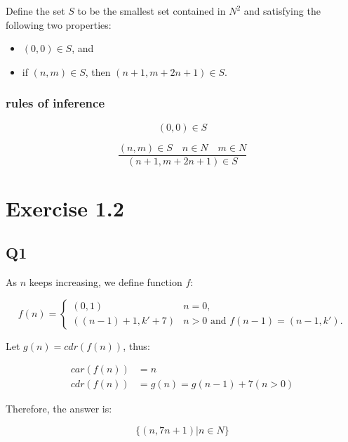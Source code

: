 \documentclass[11pt,a4paper]{article}
\begin{document}
Define the set $S$ to be the smallest set contained in $N^2$
and satisfying the following two properties:

\begin{itemize}
    \item{$(0,0) \in S$, and}
    \item{if $(n,m) \in S$, then $(n+1,m+2n+1) \in S$.}
\end{itemize}

\subsubsection{rules of inference}

\begin{equation*}
    (0,0) \in S
\end{equation*}

\begin{equation*}
    \frac
        {(n,m) \in S \quad n \in N \quad m \in N}
        {(n+1,m+2n+1) \in S}
\end{equation*}

\section{Exercise 1.2}

\subsection{Q1}

As $n$ keeps increasing, we define function $f$:

\begin{equation*}
    f(n) =
    \begin{cases}
        (0,1) & n = 0, \\
        ((n-1)+1, k'+7) & n > 0 \text{ and } f(n-1) = (n-1,k').
    \end{cases}
\end{equation*}

Let $g(n) = cdr(f(n))$, thus:

\begin{align*}
    car(f(n)) & = n \\
    cdr(f(n)) & = g(n) = g(n-1) + 7 (n > 0)
\end{align*}

Therefore, the answer is:

\begin{equation*}
    \{ (n,7n+1) | n \in N \}
\end{equation*}
\end{document}
